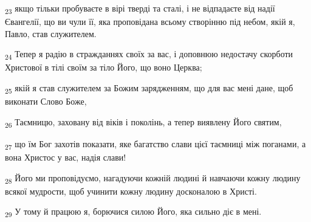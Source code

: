 \begin{tcolorbox}
\textsubscript{23} якщо тільки пробуваєте в вірі тверді та сталі, і не відпадаєте від надії Євангелії, що ви чули її, яка проповідана всьому створінню під небом, якій я, Павло, став служителем.
\end{tcolorbox}
\begin{tcolorbox}
\textsubscript{24} Тепер я радію в стражданнях своїх за вас, і доповнюю недостачу скорботи Христової в тілі своїм за тіло Його, що воно Церква;
\end{tcolorbox}
\begin{tcolorbox}
\textsubscript{25} якій я став служителем за Божим зарядженням, що для вас мені дане, щоб виконати Слово Боже,
\end{tcolorbox}
\begin{tcolorbox}
\textsubscript{26} Таємницю, заховану від віків і поколінь, а тепер виявлену Його святим,
\end{tcolorbox}
\begin{tcolorbox}
\textsubscript{27} що їм Бог захотів показати, яке багатство слави цієї таємниці між поганами, а вона Христос у вас, надія слави!
\end{tcolorbox}
\begin{tcolorbox}
\textsubscript{28} Його ми проповідуємо, нагадуючи кожній людині й навчаючи кожну людину всякої мудрости, щоб учинити кожну людину досконалою в Христі.
\end{tcolorbox}
\begin{tcolorbox}
\textsubscript{29} У тому й працюю я, борючися силою Його, яка сильно діє в мені.
\end{tcolorbox}

